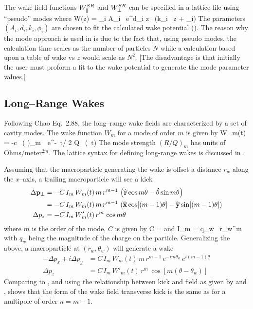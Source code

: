 The wake field functions $W^{SR}_\parallel$ and $W^{SR}_\perp$ can be specified in a \bmad
lattice file using ``pseudo'' modes where
\Begineq
  W(z) = \sum_i A_i \, e^{d_i z} \, \sin (k_i \, z + \phi_i)
  \label{wadzk}
\Endeq
The parameters $(A_i, d_i, k_i, \phi_i)$ are chosen to fit the calculated wake potential
(). The reason why the mode approach is used in \bmad is due to the
fact that, using pseudo modes, the calculation time scales as the number of particles $N$
while a calculation based upon a table of wake vs $z$ would scale as $N^2$. [The
disadvantage is that initially the user must proform a fit to the wake potential to
generate the mode parameter values.]

\subsection{Long--Range Wakes}
\label{s:wake.long}

Following Chao\cite{b:chao} Eq.~2.88, the long--range wake fields are
characterized by a set of cavity modes. The wake function $W_m$ for a
mode of order $m$ is given by
\Begineq
  W_m(t) = -c \, \left(  \right)_m \,\,
  e^{-\omega \, t/ 2 Q} \, \sin (\omega \, t)
  \label{wcrq}
\Endeq
The mode strength $(R/Q)_m$ has units of Ohms/meter$^{2m}$.
The lattice syntax for defining long-range wakes is discussed in .

Assuming that the macroparticle generating the wake is offset a
distance $r_w$ along the $x$--axis, a trailing macroparticle will see a kick
\begin{align}
  \Delta {{\bf p}}_\perp &= 
    -C \, I_m \, W_m(t) \, m \, r^{m-1} \, \left( 
    {\widehat{\bf r}} \cos m\theta - {\bf\hat\theta} \sin m\theta \right) \\
  &= -C \, I_m \, W_m(t) \, m \, r^{m-1} \, \left( 
    {\widehat{\bf x}} \cos [(m-1) \theta] - 
    {\widehat{\bf y}} \sin [(m-1)\theta] \right) \nonumber \\
  \Delta p_z &= -C \, I_m \, W'_m(t) \, r^m \, \cos m\theta
\end{align}
where $m$ is the order of the mode, $C$ is given by
\Begineq
  C = 
\Endeq
 and
\Begineq
  I_m = q_w \, r_w^m
\Endeq
with $q_w$ being the magnitude of the charge on the particle. 
Generalizing the above, a macroparticle at $(r_w, \theta_w)$ will generate a wake
\begin{align}
  -\Delta p_x + i\Delta p_y &= C \, I_m \, W_m(t) \, 
    m \, r^{m-1} \, e^{-i m \theta_w} \, e^{i (m-1) \theta} 
    \label{ppcimr} \\
  \Delta p_z &= C \, I_m \, W'_m(t) \, r^m \, \cos [m(\theta - \theta_w)]
    \label{pciwr}
\end{align}
Comparing  to , and using the relationship between
kick and field as given by  and , shows that
the form of the wake field transverse kick is the same as for a
multipole of order $n = m - 1$. 

